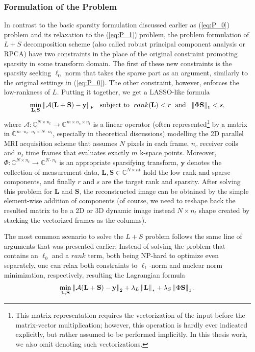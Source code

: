 \subsubsection{Formulation of the Problem}
In contrast to the basic sparsity formulation discussed earlier as (\ref{eq:P_0}) problem and its relaxation to the (\ref{eq:P_1}) problem, the problem formulation of $L+S$ decomposition scheme (also called robust principal component analysis or RPCA) have two constraints in the place of the original constraint promoting sparsity in some transform domain. The first of these new constraints is the sparsity seeking $\ell_0$ norm that takes the sparse part as an argument, similarly to the original settings in (\ref{eq:P_0}). The other constraint, however, enforces the low-rankness of $L$. Putting it together, we get a LASSO-like formula
\[\min_{\mathbf{L,S}} \left\lVert\mathcal{A}\mathbf{(L+S) - y}\right\rVert_F\; \text{ subject to }\; rank(\mathbf{L}) < r\; \text{ and }\; \left\lVert\Phi \mathbf{S}\right\rVert_1 < s,\]
where $\mathcal{A}: \mathbb{C}^{N \times n_t} \rightarrow \mathbb{C}^{m \times n_c \times n_t}$ is a linear operator (often represented\footnote{This matrix representation requires the vectorization of the input before the matrix-vector multiplication; however, this operation is hardly ever indicated explicitly, but rather assumed to be performed implicitly. In this thesis work, we also omit denoting such vectorizations.} by a matrix in $\mathbb{C}^{m \cdot n_c \cdot n_t \times N \cdot n_t}$, especially in theoretical discussions) modelling the 2D parallel MRI acquisition scheme that assumes $N$ pixels in each frame, $n_c$ receiver coils and $n_t$ time frames that evaluates exactly $m$ k-space points. Moreover, $\Phi: \mathbb{C}^{N \times n_t} \rightarrow \mathbb{C}^{N \cdot n_t}$ is an appropriate sparsifying transform, $\mathbf{y}$ denotes the collection of measurement data, $\mathbf{L, S} \in \mathbb{C}^{N \times nt}$ hold the low rank and sparse components, and finally $r$ and $s$ are the target rank and sparsity. After solving this problem for $\mathbf{L}$ and $\mathbf{S}$, the reconstructed image can be obtained by the simple element-wise addition of components (of course, we need to reshape back the resulted matrix to be a 2D or 3D dynamic image instead $N\times n_t$ shape created by stacking the vectorized frames as the columns).

The most common scenario to solve the $L+S$ problem follows the same line of arguments that was presented earlier: Instead of solving the problem that contains an $\ell_0$ and a $rank$ term, both being NP-hard to optimize even separately, one can relax both constraints to $\ell_1$-norm and nuclear norm minimization, respectively, resulting the Lagrangian formula
\[\min_{\mathbf{L,S}} \left\lVert\mathcal{A}\mathbf{(L+S) - y}\right\rVert_2 + \lambda_L \left\lVert\mathbf{L}\right\rVert_* + \lambda_S \left\lVert\Phi \mathbf{S}\right\rVert_1.\]

